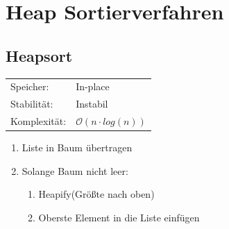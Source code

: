 \documentclass[12pt,a4paper]{article}
\begin{document}
\section{Heap Sortierverfahren}
\subsection{Heapsort}
	\begin{tabularx}{\textwidth}{l l}
		Speicher: &In-place\\
		Stabilität: &Instabil\\
		Komplexität: &$\mathcal{O}(n \cdot log(n))$\\
	\end{tabularx}
	\vspace{.8cm}
	\newline
	\begin{minipage}[c]{0.5\textwidth}
		\begin{enumerate}
			\item Liste in Baum übertragen
			\item Solange Baum nicht leer:
			\begin{enumerate}
				\item Heapify(Größte nach oben)
				\item Oberste Element in die Liste einfügen
			\end{enumerate}
		\end{enumerate}
	\end{minipage}
\end{document}
